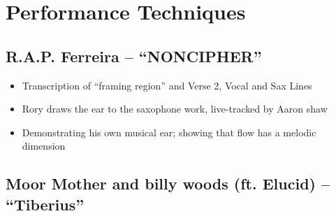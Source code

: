 \section{Performance Techniques}
\subsection*{\centering R.A.P. Ferreira -- ``NONCIPHER''}
    \begin{itemize}
        \item Transcription of ``framing region'' and Verse 2, Vocal and Sax Lines
        \item Rory draws the ear to the saxophone work, live-tracked by Aaron shaw
        \item Demonstrating his own musical ear; showing that flow has a melodic dimension
    \end{itemize}
  
\subsection*{\centering Moor Mother and billy woods (ft. Elucid)  -- ``Tiberius''}
